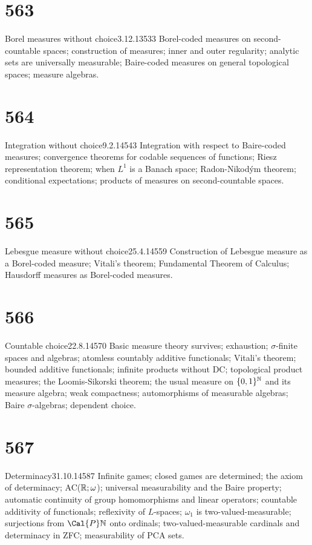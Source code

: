 \section{563}{Borel measures without choice}{3.12.13}{}{533}
{Borel-coded measures on second-countable spaces;  construction of
measures;  inner and outer regularity;
analytic sets are universally measurable;   Baire-coded measures
on general topological spaces;  measure algebras.}

\section{564}{Integration without choice}{9.2.14}{}{543}
{Integration with respect to Baire-coded measures;  convergence theorems
for codable sequences of functions;  Riesz representation theorem;  when
$L^1$ is a Banach space;  Radon-Nikod\'ym theorem;  conditional
expectations;  products of measures on second-countable spaces.}

\section{565}{Lebesgue measure without choice}{25.4.14}{}{559}
{Construction of Lebesgue measure as a Borel-coded measure;  Vitali's
theorem;  Fundamental Theorem of Calculus;  Hausdorff measures as
Borel-coded measures.}

\section{566}{Countable choice}{22.8.14}{}{570}
{Basic measure theory survives;  exhaustion;  $\sigma$-finite spaces and
algebras;  atomless countably additive functionals;  Vitali's theorem;
bounded additive functionals;  infinite products without DC;  topological
product measures;  the Loomis-Sikorski theorem;
the usual measure on $\{0,1\}^{\Bbb{N}}$ and its measure
algebra;  weak compactness;  automorphisms of measurable algebras;  Baire
$\sigma$-algebras;  dependent choice.}

\section{567}{Determinacy}{31.10.14}{}{587}
{Infinite games;  closed games are determined;  the axiom of determinacy;
AC($\Bbb{R};\omega$);  universal measurability and the Baire property;
automatic continuity of group homomorphisms and linear operators;
countable additivity of functionals;  reflexivity of $L$-spaces;
$\omega_1$ is two-valued-measurable;  surjections from $\Cal{P}\Bbb{N}$
onto ordinals;  two-valued-measurable cardinals and determinacy in ZFC;
measurability of PCA sets.
}

